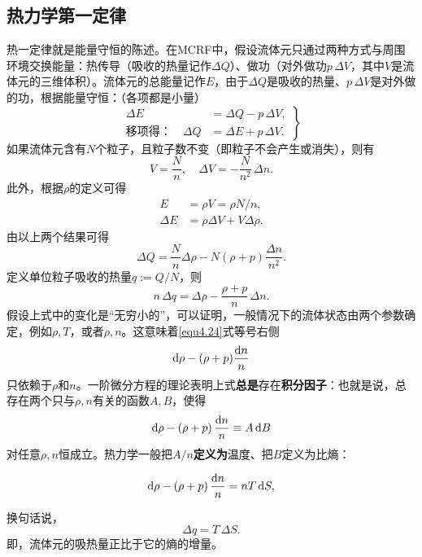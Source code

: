 \subsection*{热力学第一定律}
热一定律就是能量守恒的陈述。在MCRF中，假设流体元只通过两种方式与周围环境交换能量：热传导（吸收的热量记作$\Delta Q$）、做功（对外做功$p \, \Delta V$，其中$V$是流体元的三维体积）。流体元的总能量记作$E$，由于$\Delta Q$是吸收的热量、$p\,\Delta V$是对外做的功，根据能量守恒：（各项都是小量）
\begin{equation}
\left.
\begin{split}
    \Delta E &= \Delta Q - p \,\Delta V, \\
\text{移项得：}\quad    \Delta Q &= \Delta E + p\,\Delta V.
\end{split}
\right\}
\label{equ4.22}
\end{equation}
如果流体元含有$N$个粒子，且粒子数不变（即粒子不会产生或消失），则有
\begin{equation}
    V = \frac{N}{n}, \quad \Delta V = -\frac{N}{n^2} \,\Delta n.
\label{equ4.23}
\end{equation}
此外，根据$\rho$的定义可得
\begin{align*}
    E &= \rho V = \rho N / n, \\
    \Delta E &= \rho \Delta V + V \Delta \rho.
\end{align*}
由以上两个结果可得
\[
    \Delta Q = \frac{N}{n} \Delta \rho - N (\rho + p) \frac{\Delta n}{n^2}.
\]
定义单位粒子吸收的热量$q := Q/N$，则
\begin{equation}
    n \,\Delta q = \Delta \rho - \frac{\rho + p}{n} \,\Delta n.
\label{equ4.24}
\end{equation}
假设上式中的变化是“无穷小的”，可以证明，一般情况下的流体状态由两个参数确定，例如$\rho, T$，或者$\rho, n$。这意味着\eqref{equ4.24}式等号右侧
\[
    \mathrm{d} \rho - (\rho + p) \frac{\mathrm{d} n}{n}
\]
只依赖于$\rho$和$n$。一阶微分方程的理论表明上式\textbf{总是}存在\textbf{积分因子}：也就是说，总存在两个只与$\rho, n$有关的函数$A, B$，使得
\[
    \mathrm{d} \rho - (\rho + p)\, \frac{\mathrm{d} n}{n} \equiv A \, \mathrm{d} B
\]
对任意$\rho, n$恒成立。热力学一般把$A/n$\textbf{定义为}温度、把$B$定义为比熵：
\begin{shaded}
\begin{equation}
    \mathrm{d} \rho - (\rho + p) \,\frac{\mathrm{d} n}{n} = nT\, \mathrm{d} S,
\label{equ4.25}
\end{equation}
\end{shaded}
换句话说，
\begin{equation}
    \Delta q = T\,\Delta S.
\label{equ4.26}
\end{equation}
即，流体元的吸热量正比于它的熵的增量。

